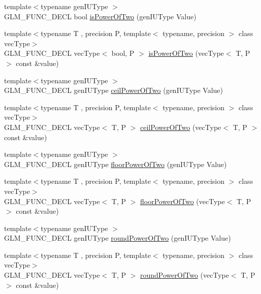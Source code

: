 \begin{DoxyCompactItemize}
\item 
{\footnotesize template$<$typename gen\+I\+U\+Type $>$ }\\G\+L\+M\+\_\+\+F\+U\+N\+C\+\_\+\+D\+E\+C\+L bool \hyperlink{group__gtc__round_gaebf826fbb6e0a70eeaab0792d89b25ec}{is\+Power\+Of\+Two} (gen\+I\+U\+Type Value)
\item 
{\footnotesize template$<$typename T , precision P, template$<$ typename, precision $>$ class vec\+Type$>$ }\\G\+L\+M\+\_\+\+F\+U\+N\+C\+\_\+\+D\+E\+C\+L vec\+Type$<$ bool, P $>$ \hyperlink{group__gtc__round_gad454e4c8d8cd73ddc7de855f733a1465}{is\+Power\+Of\+Two} (vec\+Type$<$ T, P $>$ const \&value)
\item 
{\footnotesize template$<$typename gen\+I\+U\+Type $>$ }\\G\+L\+M\+\_\+\+F\+U\+N\+C\+\_\+\+D\+E\+C\+L gen\+I\+U\+Type \hyperlink{group__gtc__round_gaa73c7690c787086fa3ac1c312264acab}{ceil\+Power\+Of\+Two} (gen\+I\+U\+Type Value)
\item 
{\footnotesize template$<$typename T , precision P, template$<$ typename, precision $>$ class vec\+Type$>$ }\\G\+L\+M\+\_\+\+F\+U\+N\+C\+\_\+\+D\+E\+C\+L vec\+Type$<$ T, P $>$ \hyperlink{group__gtc__round_ga76ec9b214ea1376fe09a903e34bab847}{ceil\+Power\+Of\+Two} (vec\+Type$<$ T, P $>$ const \&value)
\item 
{\footnotesize template$<$typename gen\+I\+U\+Type $>$ }\\G\+L\+M\+\_\+\+F\+U\+N\+C\+\_\+\+D\+E\+C\+L gen\+I\+U\+Type \hyperlink{group__gtc__round_gac80f6519c31baae10d8d7bea6735d1fa}{floor\+Power\+Of\+Two} (gen\+I\+U\+Type Value)
\item 
{\footnotesize template$<$typename T , precision P, template$<$ typename, precision $>$ class vec\+Type$>$ }\\G\+L\+M\+\_\+\+F\+U\+N\+C\+\_\+\+D\+E\+C\+L vec\+Type$<$ T, P $>$ \hyperlink{group__gtc__round_ga6a5a8f6dd1b2f755e4572bd039062c37}{floor\+Power\+Of\+Two} (vec\+Type$<$ T, P $>$ const \&value)
\item 
{\footnotesize template$<$typename gen\+I\+U\+Type $>$ }\\G\+L\+M\+\_\+\+F\+U\+N\+C\+\_\+\+D\+E\+C\+L gen\+I\+U\+Type \hyperlink{group__gtc__round_ga6d24a9e3abe3e6a908661b43acb8efe0}{round\+Power\+Of\+Two} (gen\+I\+U\+Type Value)
\item 
{\footnotesize template$<$typename T , precision P, template$<$ typename, precision $>$ class vec\+Type$>$ }\\G\+L\+M\+\_\+\+F\+U\+N\+C\+\_\+\+D\+E\+C\+L vec\+Type$<$ T, P $>$ \hyperlink{group__gtc__round_gae95be3b384f3bbd00c6c1cf0a1f96485}{round\+Power\+Of\+Two} (vec\+Type$<$ T, P $>$ const \&value)

\end{DoxyCompactItemize}
